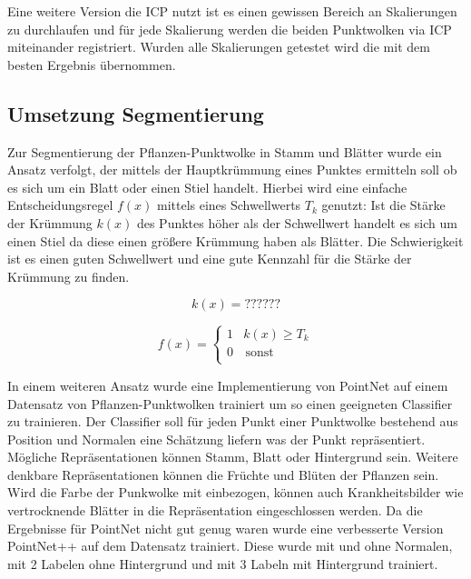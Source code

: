 \documentclass[12pt,titlepage, twoside]{article}
\begin{document}
Eine weitere Version die ICP nutzt ist es einen gewissen Bereich an Skalierungen zu durchlaufen und für jede Skalierung werden die beiden Punktwolken via ICP miteinander registriert.
Wurden alle Skalierungen getestet wird die mit dem besten Ergebnis übernommen.

\subsection{Umsetzung Segmentierung}
\label{sec:realisierung:implementierung3}

Zur Segmentierung der Pflanzen-Punktwolke in Stamm und Blätter wurde ein Ansatz verfolgt, der mittels der Hauptkrümmung eines Punktes ermitteln soll ob es sich um ein Blatt oder einen Stiel handelt. 
Hierbei wird eine einfache Entscheidungsregel $f(x)$ mittels eines Schwellwerts $T_k$ genutzt: Ist die Stärke der Krümmung $k(x)$ des Punktes höher als der Schwellwert handelt es sich um einen Stiel da diese einen größere Krümmung haben als Blätter.
Die Schwierigkeit ist es einen guten Schwellwert und eine gute Kennzahl für die Stärke der Krümmung zu finden.

\begin{equation}
\label{eq:manuell_classifier}
k(x) = ??????
\end{equation}


\begin{equation}
\label{eq:manuell_classifier}
f(x) = \left\{
\begin{array}{ll}
1 & k(x) \geq T_k \\
0 & \, \textrm{sonst} \\
\end{array}
\right. 
\end{equation}

In einem weiteren Ansatz wurde eine Implementierung von PointNet auf einem Datensatz von Pflanzen-Punktwolken trainiert um so einen geeigneten Classifier zu trainieren. 
Der Classifier soll für jeden Punkt einer Punktwolke bestehend aus Position und Normalen eine Schätzung liefern was der Punkt repräsentiert. Mögliche Repräsentationen können Stamm, Blatt oder Hintergrund sein.
Weitere denkbare Repräsentationen können die Früchte und Blüten der Pflanzen sein. Wird die Farbe der Punkwolke mit einbezogen, können auch Krankheitsbilder wie vertrocknende Blätter in die Repräsentation eingeschlossen werden.  
Da die Ergebnisse für PointNet nicht gut genug waren wurde eine verbesserte Version PointNet++ auf dem Datensatz trainiert. Diese wurde mit und ohne Normalen, mit 2 Labelen ohne Hintergrund und mit 3 Labeln mit Hintergrund trainiert.
\end{document}
